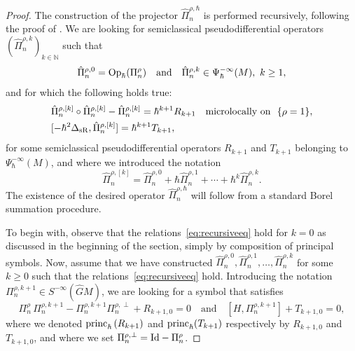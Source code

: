 \documentclass[12pt,a4paper]{amsart}
\theoremstyle{plain}
\theoremstyle{definition}
\theoremstyle{remark}
\numberwithin{equation}{section}
\theoremstyle{definition}
\def\N{{\mathbb N}}%
\def \Op{{\rm Op}}
\def \Ghat{\widehat{G}}
\def \princ{{\rm princ}_{\hbar}}
\numberwithin{equation}{section}
\begin{document}
\begin{proof}
    The construction of the projector $\hat{\Pi}_n^{\rho,\hbar}$ is performed recursively, following the proof of \cite[Theorem 1.2]{BFKRV}. We are looking for semiclassical pseudodifferential operators $(\hat{\Pi}_n^{\rho,k})_{k\in\N}$ such that 
    \begin{equation*}
        \hat{\Pi}_n^{\rho,0} = \Op_\hbar(\Pi_n^{\rho})\quad \mbox{and}\quad \hat{\Pi}_n^{\rho,k} \in \Psi_\hbar^{-\infty}(M),\ k\geq 1,
    \end{equation*}
    and for which the following holds true:
    \begin{equation}
    \begin{aligned}\label{eq:recursiveeq}
	&\hat{\Pi}_n^{\rho,[k]}\circ \hat{\Pi}_n^{\rho,[k]} -\hat{\Pi}_n^{\rho,[k]} =\hbar^{k+1}R_{k+1}\quad\mbox{microlocally on }\ \{\rho=1\},\\
	&[-\hbar^2 \Delta_{\rm sR},\hat{\Pi}_n^{\rho,[k]}]=\hbar^{k+1}T_{k+1},
    \end{aligned}
    \end{equation}
    for some semiclassical pseudodifferential operators $R_{k+1}$ and $T_{k+1}$ belonging to $\Psi_\hbar^{-\infty}(M)$, and where we introduced the notation
    \begin{equation*}
        \hat{\Pi}_n^{\rho,[k]} = \hat{\Pi}_n^{\rho,0} + \hbar \hat{\Pi}_n^{\rho,1}+\cdots+ \hbar^k \hat{\Pi}_n^{\rho,k}.
    \end{equation*}
    The existence of the desired operator $\hat{\Pi}_n^{\rho,\hbar}$ will follow from a standard Borel summation procedure.

    To begin with, observe that the relations~\eqref{eq:recursiveeq} hold for $k=0$ as discussed in the beginning of the section, simply by composition of principal symbols. Now, assume that we have constructed $\hat{\Pi}_n^{\rho,0},\hat{\Pi}_n^{\rho,1},\dots, \hat{\Pi}_n^{\rho,k}$ for some $k\geq 0$ such that the relations~\eqref{eq:recursiveeq} hold.
    Introducing the notation $\Pi_n^{\rho,k+1}\in S^{-\infty}(\Ghat M)$, we are looking for a symbol that satisfies
    \begin{equation}
        \label{eq:recursivePik+1}
          \Pi_n^{\rho}\,\Pi_n^{\rho,k+1} - \Pi_n^{\rho,k+1} \Pi_n^{\rho,\perp}+ R_{k+1,0} = 0\quad \mbox{and}\quad [H,\Pi_n^{\rho,k+1}]+ T_{k+1,0} = 0,
    \end{equation}
    where we denoted $\princ\left(R_{k+1}\right)$ and $\princ(T_{k+1})$ respectively by $R_{k+1,0}$ and $T_{k+1,0}$, and where we set $\Pi_n^{\rho,\perp} = {\rm Id}-\Pi_n^\rho$.


\end{proof}
\end{document}
